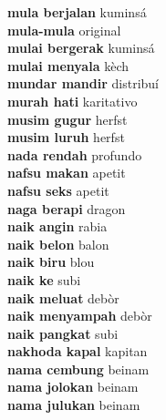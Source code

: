 \textbf{ mula berjalan  } kuminsá \\
\textbf{ mula-mula  } original \\
\textbf{ mulai bergerak  } kuminsá \\
\textbf{ mulai menyala  } kèch \\
\textbf{ mundar mandir  } distribuí \\
\textbf{ murah hati  } karitativo \\
\textbf{ musim gugur  } herfst \\
\textbf{ musim luruh  } herfst \\
\textbf{ nada rendah  } profundo \\
\textbf{ nafsu makan  } apetit \\
\textbf{ nafsu seks  } apetit \\
\textbf{ naga berapi  } dragon \\
\textbf{ naik angin  } rabia \\
\textbf{ naik belon  } balon \\
\textbf{ naik biru  } blou \\
\textbf{ naik ke  } subi \\
\textbf{ naik meluat  } debòr \\
\textbf{ naik menyampah  } debòr \\
\textbf{ naik pangkat  } subi \\
\textbf{ nakhoda kapal  } kapitan \\
\textbf{ nama cembung  } beinam \\
\textbf{ nama jolokan  } beinam \\
\textbf{ nama julukan  } beinam \\
